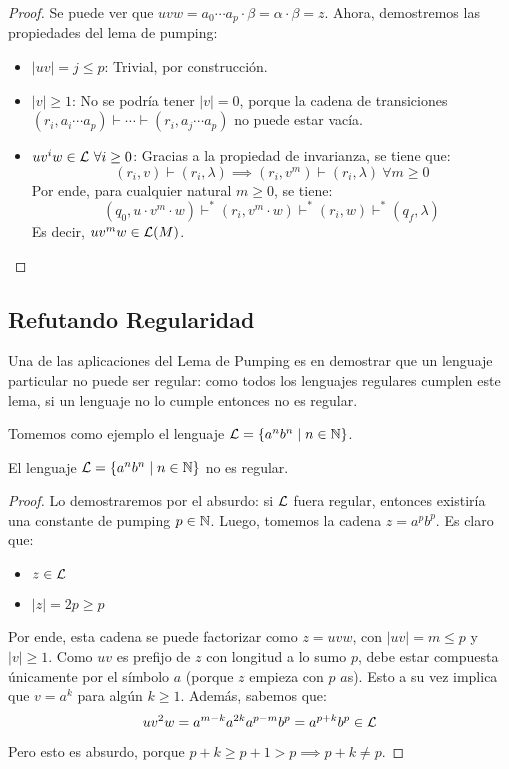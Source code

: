 \begin{proof}
    Se puede ver que $uvw = a_0 \cdots a_p \cdot \beta = \alpha \cdot \beta = z$. Ahora, demostremos las propiedades del lema de pumping:
    \begin{itemize}
        \item $|uv| = j \leq p$: Trivial, por construcción.
        \item $|v| \geq 1$: No se podría tener $|v| = 0$, porque la cadena de transiciones $(r_i, a_i \cdots a_p) \vdash \cdots \vdash (r_i, a_j \cdots a_p)$ no puede estar vacía.
        \item $u v^i w \in \mathcal{L} \ \forall i \geq 0$: Gracias a la propiedad de invarianza, se tiene que:
        $$
            (r_i, v) \vdash (r_i, \lambda) \implies (r_i, v^m) \vdash (r_i, \lambda) \ \forall m \geq 0
        $$
        Por ende, para cualquier natural $m \geq 0$, se tiene:
        $$
            (q_0, u \cdot v^m \cdot w) \vdash^* (r_i, v^m \cdot w) \vdash^* (r_i, w) \vdash^* (q_f, \lambda)
        $$
        Es decir, $u v^m w \in \mathcal{L}(M)$.
    \end{itemize}
\end{proof}

\subsection{Refutando Regularidad}

Una de las aplicaciones del Lema de Pumping es en demostrar que un lenguaje particular no puede ser regular: como todos los lenguajes regulares cumplen este lema, si un lenguaje no lo cumple entonces no es regular.

Tomemos como ejemplo el lenguaje $\mathcal{L} = \{a^n b^n \mid n \in \mathbb{N}\}$.

\begin{theorem*}
    El lenguaje $\mathcal{L} = \{a^n b^n \mid n \in \mathbb{N}\}$ no es regular.
\end{theorem*}
\begin{proof}
    Lo demostraremos por el absurdo: si $\mathcal{L}$ fuera regular, entonces existiría una constante de pumping $p \in \mathbb{N}$. Luego, tomemos la cadena $z = a^p b^p$. Es claro que:
    \begin{itemize}
        \item $z \in \mathcal{L}$
        \item $|z| = 2p \geq p$
    \end{itemize}

    Por ende, esta cadena se puede factorizar como $z = uvw$, con $|uv| = m \leq p$ y $|v| \geq 1$. Como $uv$ es prefijo de $z$ con longitud a lo sumo $p$, debe estar compuesta únicamente por el símbolo $a$ (porque $z$ empieza con $p$ $a$s). Esto a su vez implica que $v = a^k$ para algún $k \geq 1$. Además, sabemos que:
    $$uv^2w = a^{m-k}a^{2k}a^{p - m}b^p = a^{p + k}b^p \in \mathcal{L}$$
    
    Pero esto es absurdo, porque $p + k \geq p + 1 > p \implies p + k \neq p$.
\end{proof}
